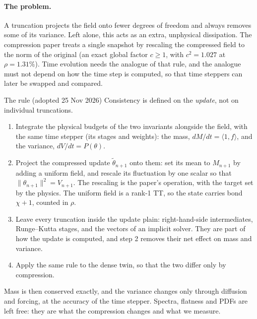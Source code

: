 \documentclass[aps,prfluids,reprint,onecolumn,amsmath,amssymb,nofootinbib,floatfix]{revtex4-2}
\begin{document}
\paragraph{The problem.} A truncation projects the field onto fewer degrees of
freedom and always removes some of its variance. Left alone, this acts as an
extra, unphysical dissipation. The compression paper treats a single snapshot by
rescaling the compressed field to the norm of the original (an exact global
factor $c\ge1$, with $c^2=1.027$ at $\rho=1.31\%$). Time evolution needs the
analogue of that rule, and the analogue must not depend on how the time step is
computed, so that time steppers can later be swapped and compared.

\begin{keybox}{The rule (adopted 25 Nov 2026)}
Consistency is defined on the \emph{update}, not on individual truncations.
\begin{enumerate}[leftmargin=*]
\item Integrate the physical budgets of the two invariants alongside the field,
      with the same time stepper (its stages and weights): the mass,
      $dM/dt=\langle1,f\rangle$, and the variance, $dV/dt=P(\theta)$.
\item Project the compressed update $\tilde\theta_{n+1}$ onto them: set its mean
      to $M_{n+1}$ by adding a uniform field, and rescale its fluctuation by one
      scalar so that $\|\theta_{n+1}\|^2 = V_{n+1}$. The rescaling is the paper's
      operation, with the target set by the physics. The uniform field is a
      rank-1 TT, so the state carries bond $\chi+1$, counted in $\rho$.
\item Leave every truncation inside the update plain: right-hand-side
      intermediates, Runge--Kutta stages, and the vectors of an implicit solver.
      They are part of how the update is computed, and step 2 removes their net
      effect on mass and variance.
\item Apply the same rule to the dense twin, so that the two differ only by
      compression.
\end{enumerate}
Mass is then conserved exactly, and the variance changes only through diffusion
and forcing, at the accuracy of the time stepper. Spectra, flatness and PDFs are
left free: they are what the compression changes and what we measure.
\end{keybox}
\end{document}

